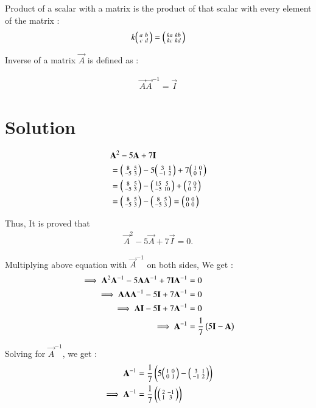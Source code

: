 \documentclass[journal,12pt,twocolumn]{IEEEtran}
\begin{document}
Product of a scalar with a matrix is the product of that scalar with every element of the matrix : 
\begin{align}
 k\begin{psmallmatrix} a & b\\c & d\end{psmallmatrix}  = \begin{psmallmatrix} ka & kb\\kc & kd\end{psmallmatrix}  
\end{align}

Inverse of a matrix $\vec{A}$ is defined as  :
  
\begin{align}
    \vec{A} \vec{A}^{-1} = \vec{I}
\end{align}

\section{Solution}


 

\begin{align}
&   \mathbf{A}^2 - 5\mathbf{A} + 7\mathbf{I} \\
&= \begin{psmallmatrix} 8 & 5\\ -5 & 3\end{psmallmatrix} -  5\begin{psmallmatrix} 3 & 1\\ -1 & 2\end{psmallmatrix} + 7\begin{psmallmatrix} 1 & 0\\ 0 & 1\end{psmallmatrix}  \\
&= \begin{psmallmatrix} 8 & 5\\ -5 & 3\end{psmallmatrix} -  \begin{psmallmatrix} 15 & 5\\ -5 & 10\end{psmallmatrix} + \begin{psmallmatrix} 7 & 0\\ 0 & 7\end{psmallmatrix}\\
&= \begin{psmallmatrix} 8 & 5\\ -5 & 3\end{psmallmatrix} - \begin{psmallmatrix} 8 & 5\\ -5 & 3\end{psmallmatrix} = \begin{psmallmatrix} 0 & 0\\ 0 & 0\end{psmallmatrix} 
\end{align}


Thus, It is proved that 
\begin{align}
\vec{A}^2 - 5\vec{A} + 7\vec{I} = 0.     
\end{align}

Multiplying above equation with $\vec{A}^{-1}$ on both sides, We get :
\begin{align}
\implies \mathbf{A}^2\mathbf{A}^{-1} - 5\mathbf{A}\mathbf{A}^{-1} + 7\mathbf{I}\mathbf{A}^{-1} &= 0 \\
\implies \mathbf{A}\mathbf{A}\mathbf{A}^{-1} - 5\mathbf{I} + 7\mathbf{A}^{-1} &= 0 \\
\implies \mathbf{A}\mathbf{I} - 5\mathbf{I} + 7\mathbf{A}^{-1} &= 0\\
\implies \mathbf{A}^{-1} &= \frac{1}{7}\left(5\mathbf{I} - \mathbf{A}\right)
\end{align}

Solving for $\vec{A}^{-1}$, we get :
\begin{align}
    \mathbf{A}^{-1} &= \frac{1}{7}\left(5\begin{psmallmatrix} 1 & 0\\ 0 & 1\end{psmallmatrix} - \begin{psmallmatrix} 3 & 1\\ -1 & 2\end{psmallmatrix}\right) \\
    \implies \mathbf{A}^{-1} &= \frac{1}{7}\left(\begin{psmallmatrix} 2 & -1\\ 1 & 3\end{psmallmatrix}\right)
\end{align}
\end{document}
